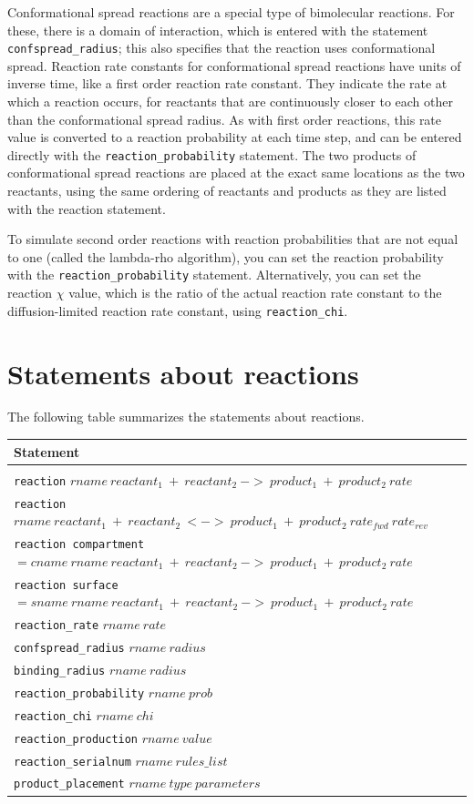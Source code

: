 \documentclass {book}
\newcommand {\ttt} {\texttt}
\begin{document}
Conformational spread reactions are a special type of bimolecular reactions. For these, there is a domain of interaction, which is entered with the statement \ttt{confspread\_radius}; this also specifies that the reaction uses conformational spread. Reaction rate constants for conformational spread reactions have units of inverse time, like a first order reaction rate constant. They indicate the rate at which a reaction occurs, for reactants that are continuously closer to each other than the conformational spread radius. As with first order reactions, this rate value is converted to a reaction probability at each time step, and can be entered directly with the \ttt{reaction\_probability} statement. The two products of conformational spread reactions are placed at the exact same locations as the two reactants, using the same ordering of reactants and products as they are listed with the reaction statement.

To simulate second order reactions with reaction probabilities that are not equal to one (called the lambda-rho algorithm), you can set the reaction probability with the \ttt{reaction\_probability} statement. Alternatively, you can set the reaction $\chi$ value, which is the ratio of the actual reaction rate constant to the diffusion-limited reaction rate constant, using \ttt{reaction\_chi}.

\section{Statements about reactions}

The following table summarizes the statements about reactions.

\begin{longtable}[c]{l}
Statement\\
\hline\\
\ttt{reaction} $rname\ reactant_1\ +\ reactant_2\ ->\ product_1\ +\ product_2\ rate$\\
\ttt{reaction} $rname\ reactant_1\ +\ reactant_2\ <->\ product_1\ +\ product_2\ rate_{fwd}\ rate_{rev}$\\
\ttt{reaction compartment}$=cname\ rname\ reactant_1\ +\ reactant_2\ ->\ product_1\ +\ product_2\ rate$\\
\ttt{reaction surface}$=sname\ rname\ reactant_1\ +\ reactant_2\ ->\ product_1\ +\ product_2\ rate$\\
\ttt{reaction\_rate} $rname\ rate$\\
\ttt{confspread\_radius} $rname\ radius$\\
\ttt{binding\_radius} $rname\ radius$\\
\ttt{reaction\_probability} $rname\ prob$\\
\ttt{reaction\_chi} $rname\ chi$\\
\ttt{reaction\_production} $rname\ value$\\
\ttt{reaction\_serialnum} $rname\ rules\_list$\\
\ttt{product\_placement} $rname\ type\ parameters$
\end{longtable}
\end{document}
